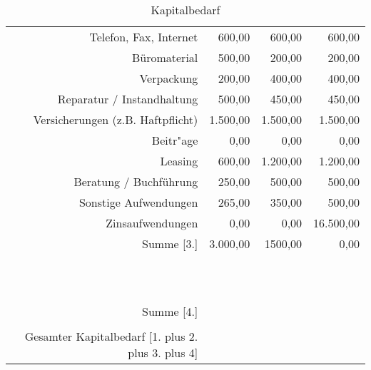 \begin{appendix}
\begin{table}
\begin{tabular}{r|r|r|r|}
		Telefon, Fax, Internet	& 600,00 & 600,00 & 600,00 \\ 
		Büromaterial	& 500,00 & 200,00 & 200,00 \\ 
		Verpackung	& 200,00 & 400,00 & 400,00 \\ 
		Reparatur / Instandhaltung	& 500,00 & 450,00  & 450,00 \\ 
		Versicherungen (z.B. Haftpflicht)	& 1.500,00 & 1.500,00 & 1.500,00 \\ 
		Beitr"age	& 0,00 & 0,00 & 0,00 \\ 
		Leasing	& 600,00 & 1.200,00 & 1.200,00 \\ 
		Beratung / Buchführung	& 250,00 & 500,00 & 500,00 \\ 
		Sonstige Aufwendungen	& 265,00 & 350,00 & 500,00 \\ 
		Zinsaufwendungen	& 0,00 & 0,00 & 16.500,00 \\ 
		\hline
		Summe [3.]	& 3.000,00 & 1500,00 & 0,00 \\ 
		\hline
			&  &  &  \\ 
			&  &  &  \\ 
			&  &  &  \\ 
			&  &  &  \\ 
			&  &  &  \\ 
			&  &  &  \\ 
			&  &  &  \\ 
			&  &  &  \\ 
			&  &  &  \\ 
			&  &  &  \\ 
			&  &  &  \\ 
			\hline
			Summe [4.]	& & & \\ 
			\hline
			&  &  &  \\ 
			\hline
			Gesamter Kapitalbedarf [1. plus 2. plus 3. plus 4]	& & & \\ 
			\hline
		\end{tabular} 
		\caption {Kapitalbedarf}
	\end{table}
	
	
	
\end{appendix}
